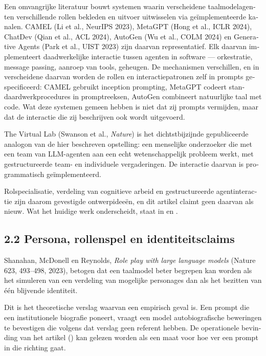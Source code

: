 \begin{dutch}
Een omvangrijke literatuur bouwt systemen waarin verscheidene taalmodelagenten verschillende rollen bekleden en uitvoer uitwisselen via geïmplementeerde kanalen. \gcheck{} CAMEL (Li et al., NeurIPS 2023), MetaGPT (Hong et al., ICLR 2024), ChatDev (Qian et al., ACL 2024), AutoGen (Wu et al., COLM 2024) en Generative Agents (Park et al., UIST 2023) zijn daarvan representatief. Elk daarvan implementeert daadwerkelijke interactie tussen agenten in software — orkestratie, message passing, aanroep van tools, geheugen. De mechanismen verschillen, en in verscheidene daarvan worden de rollen en interactiepatronen zelf in prompts gespecificeerd: CAMEL gebruikt inception prompting, MetaGPT codeert standaardwerkprocedures in promptreeksen, AutoGen combineert natuurlijke taal met code. Wat deze systemen gemeen hebben is niet dat zij prompts vermijden, maar dat de interactie die zij beschrijven ook wordt uitgevoerd.

\gcheck{} The Virtual Lab (Swanson et al., \emph{Nature}) is het dichtstbijzijnde gepubliceerde analogon van de hier beschreven opstelling: een menselijke onderzoeker die met een team van LLM-agenten aan een echt wetenschappelijk probleem werkt, met gestructureerde team- en individuele vergaderingen. De interactie daarvan is programmatisch geïmplementeerd.

Rolspecialisatie, verdeling van cognitieve arbeid en gestructureerde agentinteractie zijn daarom gevestigde ontwerpideeën, en dit artikel claimt geen daarvan als nieuw. Wat het huidige werk onderscheidt, staat in  en .


\subsection*{2.2 Persona, rollenspel en identiteitsclaims}
\label{sec:nl:2.2}

\gcheck{} Shanahan, McDonell en Reynolds, \emph{Role play with large language models} (Nature 623, 493–498, 2023), betogen dat een taalmodel beter begrepen kan worden als het simuleren van een verdeling van mogelijke personages dan als het bezitten van één blijvende identiteit.

Dit is het theoretische verslag waarvan  een empirisch geval is. Een prompt die een institutionele biografie poneert, vraagt een model autobiografische beweringen te bevestigen die volgens dat verslag geen referent hebben. De operationele bevinding van het artikel () kan gelezen worden als een maat voor hoe ver een prompt in die richting gaat.



\end{dutch}
